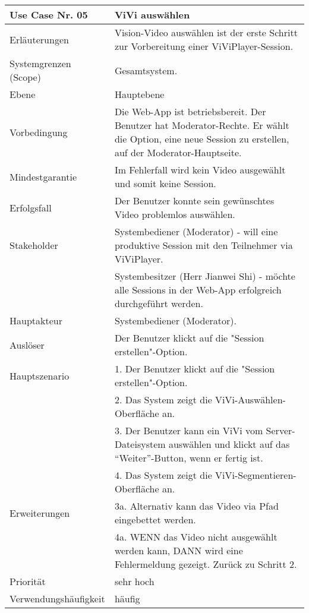 \begin{tabularx}{\linewidth}{|l|X|}
	\hline
	Use Case Nr. 05			& \textbf{ViVi auswählen} \\ \hline
	Erläuterungen			& Vision-Video auswählen ist der erste Schritt zur Vorbereitung 
							  einer ViViPlayer-Session. \\ \hline
	Systemgrenzen (Scope)	& Gesamtsystem. \\ \hline
	Ebene					& Hauptebene \\ \hline
	Vorbedingung			& Die Web-App ist betriebsbereit. Der Benutzer hat 
							  Moderator-Rechte. Er wählt die Option, eine neue Session zu 
							  erstellen, auf der Moderator-Hauptseite. \\ \hline
	Mindestgarantie			& Im Fehlerfall wird kein Video ausgewählt und somit keine 
							  Session.\\ \hline
	Erfolgsfall 			& Der Benutzer konnte sein gewünschtes Video problemlos auswählen. 
							  \\ \hline
	Stakeholder				& Systembediener (Moderator) - will eine produktive Session mit den 
							  Teilnehmer via ViViPlayer. \\
							& Systembesitzer (Herr Jianwei Shi) - möchte alle Sessions in der 
							  Web-App erfolgreich durchgeführt werden. \\ \hline
	Hauptakteur				& Systembediener (Moderator). \\ \hline
	Auslöser				& Der Benutzer klickt auf die "Session erstellen"-Option. \\ \hline	
	Hauptszenario			& 1. Der Benutzer klickt auf die "Session erstellen"-Option. \\
							& 2. Das System zeigt die ViVi-Auswählen-Oberfläche an. \\
							& 3. Der Benutzer kann ein ViVi vom Server-Dateisystem auswählen 
							  und klickt auf das ``Weiter''-Button, wenn er fertig ist. \\
							& 4. Das System zeigt die ViVi-Segmentieren-Oberfläche an. \\ \hline
	Erweiterungen			& 3a. Alternativ kann das Video via Pfad eingebettet werden. \\ 
							& 4a. WENN das Video nicht ausgewählt werden kann, DANN wird eine 
							  Fehlermeldung gezeigt. Zurück zu Schritt 2. \\ \hline
	Priorität				& sehr hoch \\ \hline
	Verwendungshäufigkeit	& häufig \\ \hline
\end{tabularx}